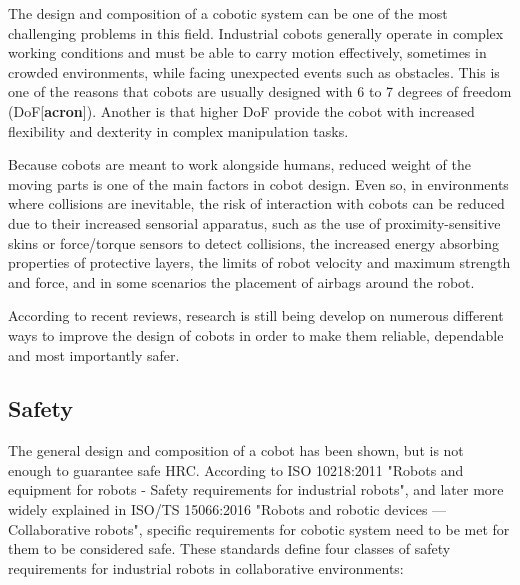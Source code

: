 \par The design and composition of a cobotic system can be one of the most challenging problems in this field. Industrial cobots generally operate in complex working conditions and must be able to carry motion effectively, sometimes in crowded environments, while facing unexpected events such as obstacles. This is one of the reasons that cobots are usually designed with 6 to 7 degrees of freedom (DoF[\textbf{acron}]). Another is that higher DoF provide the cobot with increased flexibility and dexterity in complex manipulation tasks.
\par Because cobots are meant to work alongside humans, reduced weight of the moving parts is one of the main factors in cobot design. Even so, in environments where collisions are inevitable, the risk of interaction with cobots can be reduced due to their increased sensorial apparatus, such as the use of proximity-sensitive skins or force/torque sensors to detect collisions, the increased energy absorbing properties of protective layers, the limits of robot velocity and maximum strength and force, and in some scenarios the placement of airbags around the robot.

\par According to recent reviews, research is still being develop on numerous different ways to improve the design of cobots in order to make them reliable, dependable and most importantly safer.



\subsection{Safety}


\par The general design and composition of a cobot has been shown, but is not enough to guarantee safe HRC. According to ISO 10218:2011 "Robots and equipment for robots - Safety requirements for industrial robots", and later more widely explained in ISO/TS 15066:2016 "Robots and robotic devices — Collaborative robots", specific requirements for cobotic system need to be met for them to be considered safe. These standards define four classes of safety requirements for industrial robots in collaborative environments:


